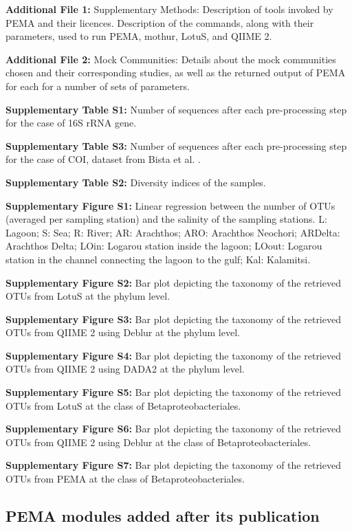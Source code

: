       \textbf{Additional File 1:} Supplementary Methods: Description of tools invoked by PEMA and their licences. Description of the commands, along with their parameters, used to run PEMA, mothur, LotuS, and QIIME 2.

      \textbf{Additional File 2:} Mock Communities: Details about the mock communities chosen and their corresponding studies, as well as the returned output of PEMA for each for a number of sets of parameters.

      \textbf{Supplementary Table S1:} Number of sequences after each pre-processing step for the case of 16S rRNA gene.

      \textbf{Supplementary Table S3:} Number of sequences after each pre-processing step for the case of COI, dataset from Bista et al. \cite{bista2017annual}.

      \textbf{Supplementary Table S2:} Diversity indices of the samples.

      \textbf{Supplementary Figure S1:} Linear regression between the number of OTUs (averaged per sampling station) and the salinity of the sampling stations. L: Lagoon; S: Sea; R: River; AR: Arachthos; ARO: Arachthos Neochori; ARDelta: Arachthos Delta; LOin: Logarou station inside the lagoon; LOout: Logarou station in the channel connecting the lagoon to the gulf; Kal: Kalamitsi.

      \textbf{Supplementary Figure S2:} Bar plot depicting the taxonomy of the retrieved OTUs from LotuS at the phylum level.

      \textbf{Supplementary Figure S3:} Bar plot depicting the taxonomy of the retrieved OTUs from QIIME 2 using Deblur at the phylum level.

      \textbf{Supplementary Figure S4:} Bar plot depicting the taxonomy of the retrieved OTUs from QIIME 2 using DADA2 at the phylum level.

      \textbf{Supplementary Figure S5:} Bar plot depicting the taxonomy of the retrieved OTUs from LotuS at the class of Betaproteobacteriales.

      \textbf{Supplementary Figure S6:} Bar plot depicting the taxonomy of the retrieved OTUs from QIIME 2 using Deblur at the class of Betaproteobacteriales.

      \textbf{Supplementary Figure S7:} Bar plot depicting the taxonomy of the retrieved OTUs from PEMA at the class of Betaproteobacteriales.
   \fi

   \subsection{PEMA modules added after its publication}

